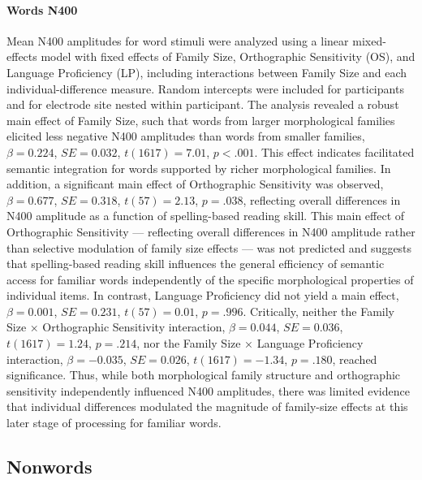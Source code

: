 \documentclass[utf8]{FrontiersinHarvard} %
\begin{document}
\paragraph*{Words N400}
Mean N400 amplitudes for word stimuli were analyzed using a linear mixed-effects model with fixed effects of Family Size, Orthographic Sensitivity (OS), and Language Proficiency (LP), including interactions between Family Size and each individual-difference measure. Random intercepts were included for participants and for electrode site nested within participant. The analysis revealed a robust main effect of Family Size, such that words from larger morphological families elicited less negative N400 amplitudes than words from smaller families, $\beta = 0.224$, $SE = 0.032$, $t(1617) = 7.01$, $p < .001$. This effect indicates facilitated semantic integration for words supported by richer morphological families. In addition, a significant main effect of Orthographic Sensitivity was observed, $\beta = 0.677$, $SE = 0.318$, $t(57) = 2.13$, $p = .038$, reflecting overall differences in N400 amplitude as a function of spelling-based reading skill. This main effect of Orthographic Sensitivity — reflecting overall differences in N400 amplitude rather than selective modulation of family size effects — was not predicted and suggests that spelling-based reading skill influences the general efficiency of semantic access for familiar words independently of the specific morphological properties of individual items. In contrast, Language Proficiency did not yield a main effect, $\beta = 0.001$, $SE = 0.231$, $t(57) = 0.01$, $p = .996$. Critically, neither the Family Size × Orthographic Sensitivity interaction, $\beta = 0.044$, $SE = 0.036$, $t(1617) = 1.24$, $p = .214$, nor the Family Size × Language Proficiency interaction, $\beta = -0.035$, $SE = 0.026$, $t(1617) = -1.34$, $p = .180$, reached significance. Thus, while both morphological family structure and orthographic sensitivity independently influenced N400 amplitudes, there was limited evidence that individual differences modulated the magnitude of family-size effects at this later stage of processing for familiar words.

\subsection{Nonwords}
\end{document}
